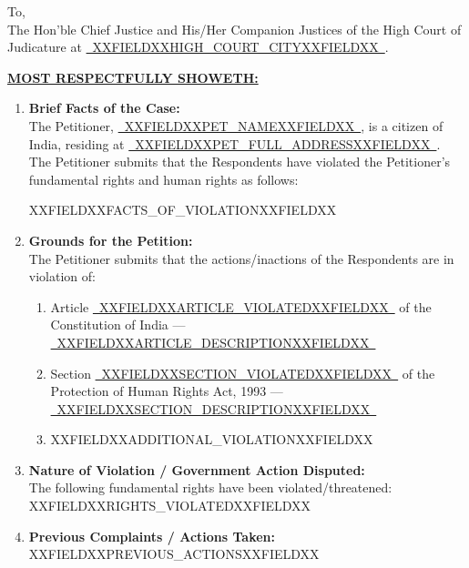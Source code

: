 \documentclass[12pt,a4paper]{article}
\newcommand{\fillline}[1]{\underline{~#1~}}
\begin{document}
\vspace{1.5em}

\noindent To,\\
The Hon'ble Chief Justice and His/Her Companion Justices of the High Court of Judicature
at \fillline{XXFIELDXXHIGH_COURT_CITYXXFIELDXX}.

\vspace{1em}

\noindent\textbf{\uline{MOST RESPECTFULLY SHOWETH:}}

\vspace{1em}

\begin{enumerate}
    \item \textbf{Brief Facts of the Case:}\\
    The Petitioner, \fillline{XXFIELDXXPET_NAMEXXFIELDXX}, is a citizen of India, residing at
    \fillline{XXFIELDXXPET_FULL_ADDRESSXXFIELDXX}. The Petitioner submits that the Respondents have violated
    the Petitioner's fundamental rights and human rights as follows:

    XXFIELDXXFACTS_OF_VIOLATIONXXFIELDXX

    \vspace{0.5em}
    \item \textbf{Grounds for the Petition:}\\
    The Petitioner submits that the actions/inactions of the Respondents are in violation of:
    \begin{enumerate}
        \item[(a)] Article \fillline{XXFIELDXXARTICLE_VIOLATEDXXFIELDXX} of the Constitution of India ---
                   \fillline{XXFIELDXXARTICLE_DESCRIPTIONXXFIELDXX}
        \item[(b)] Section \fillline{XXFIELDXXSECTION_VIOLATEDXXFIELDXX} of the Protection of Human Rights Act, 1993 ---
                   \fillline{XXFIELDXXSECTION_DESCRIPTIONXXFIELDXX}
        \item[(c)] XXFIELDXXADDITIONAL_VIOLATIONXXFIELDXX
    \end{enumerate}

    \vspace{0.5em}
    \item \textbf{Nature of Violation / Government Action Disputed:}\\
    The following fundamental rights have been violated/threatened:
    XXFIELDXXRIGHTS_VIOLATEDXXFIELDXX

    \vspace{0.5em}
    \item \textbf{Previous Complaints / Actions Taken:}\\
    XXFIELDXXPREVIOUS_ACTIONSXXFIELDXX


\end{enumerate}
\end{document}
